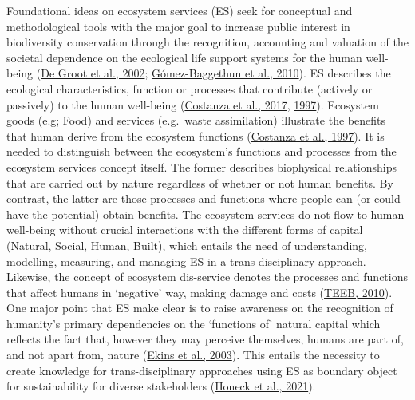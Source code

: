 \documentclass[]{elsarticle} %
\begin{document}
Foundational ideas on ecosystem services (ES) seek for conceptual and methodological tools with the major goal to increase public interest in biodiversity conservation through the recognition, accounting and valuation of the societal dependence on the ecological life support systems for the human well-being (\protect\hyperlink{ref-DeGroot2002}{De Groot et al., 2002}; \protect\hyperlink{ref-Gomez-Baggethun2010}{Gómez-Baggethun et al., 2010}).
ES describes the ecological characteristics, function or processes that contribute (actively or passively) to the human well-being (\protect\hyperlink{ref-Costanza2017}{Costanza et al., 2017}, \protect\hyperlink{ref-Costanza1997}{1997}).
Ecosystem goods (e.g; Food) and services (e.g.~waste assimilation) illustrate the benefits that human derive from the ecosystem functions (\protect\hyperlink{ref-Costanza1997}{Costanza et al., 1997}).
It is needed to distinguish between the ecosystem's functions and processes from the ecosystem services concept itself.
The former describes biophysical relationships that are carried out by nature regardless of whether or not human benefits.
By contrast, the latter are those processes and functions where people can (or could have the potential) obtain benefits.
The ecosystem services do not flow to human well-being without crucial interactions with the different forms of capital (Natural, Social, Human, Built), which entails the need of understanding, modelling, measuring, and managing ES in a trans-disciplinary approach.
Likewise, the concept of ecosystem dis-service denotes the processes and functions that affect humans in `negative' way, making damage and costs (\protect\hyperlink{ref-TEEB2010}{TEEB, 2010}).
One major point that ES make clear is to raise awareness on the recognition of humanity's primary dependencies on the `functions of' natural capital which reflects the fact that, however they may perceive themselves, humans are part of, and not apart from, nature (\protect\hyperlink{ref-Ekins2003}{Ekins et al., 2003}).
This entails the necessity to create knowledge for trans-disciplinary approaches using ES as boundary object for sustainability for diverse stakeholders (\protect\hyperlink{ref-Honeck2021}{Honeck et al., 2021}).
\end{document}
